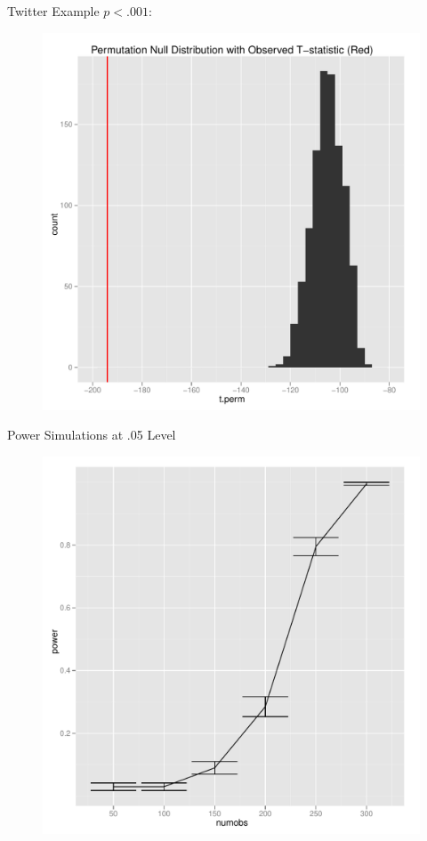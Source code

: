 \documentclass{beamer}
\begin{document}
\begin{frame}{Twitter Example}
  $p < .001$:
    \begin{figure}[!ht]
   \centering
   \includegraphics[scale=.4]{pres6.pdf}
 \end{figure}
\end{frame}

\begin{frame}{Power Simulations at .05 Level}
   \begin{figure}[!ht]
   \centering
   \includegraphics[scale=.4]{pres7.pdf}
 \end{figure}
\end{frame}
\end{document}
